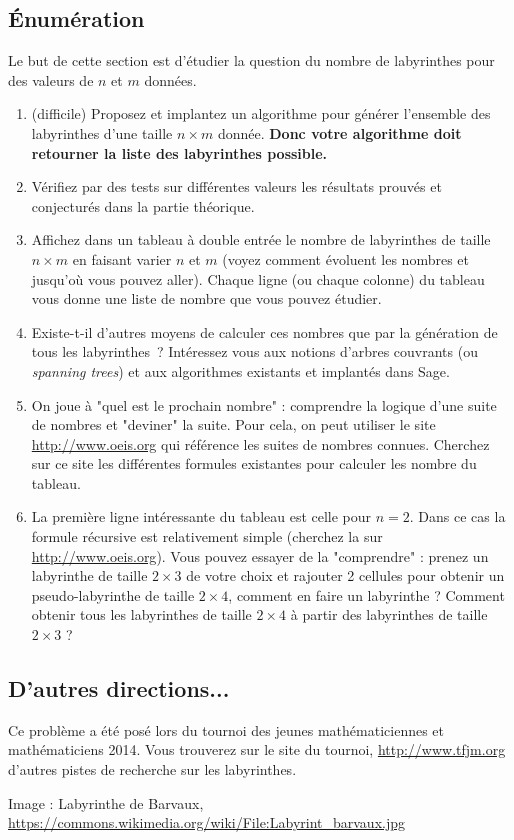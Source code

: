\documentclass{../ficheTDTP}
\begin{document}
\subsection{\'Enumération}

Le but de cette section est d'étudier la question du nombre de labyrinthes pour des valeurs de $n$ et $m$ données.

\begin{enumerate}
\item (difficile) Proposez et implantez un algorithme pour générer l'ensemble des labyrinthes d'une taille $n\times m$ donnée. \textbf{Donc votre algorithme doit retourner la liste des labyrinthes possible.}

\item Vérifiez par des tests sur différentes valeurs les résultats prouvés et conjecturés dans la partie théorique.

\item Affichez dans un tableau à double entrée le nombre de labyrinthes de taille $n \times m$ en faisant varier $n$ et $m$ (voyez comment évoluent les nombres et jusqu'où vous pouvez aller). Chaque ligne (ou chaque colonne) du tableau vous donne une liste de nombre que vous pouvez étudier. 

\item Existe-t-il d'autres moyens de calculer ces nombres que par la génération de tous les labyrinthes~? Intéressez vous aux notions d'arbres couvrants (ou \emph{spanning trees}) et aux algorithmes existants et implantés dans Sage. 

\item On joue à "quel est le prochain nombre" : comprendre la logique d'une suite de nombres et "deviner" la suite. Pour cela, on peut utiliser le site \url{http://www.oeis.org} qui référence les suites de nombres connues. Cherchez sur ce site les différentes formules existantes pour calculer les nombre du tableau. 

\item La première ligne intéressante du tableau est celle pour $n=2$. Dans ce cas la formule récursive est relativement simple (cherchez la sur \url{http://www.oeis.org}). Vous pouvez essayer de la "comprendre" : prenez un labyrinthe de taille $2 \times 3$ de votre choix et rajouter 2 cellules pour obtenir un pseudo-labyrinthe de taille $2 \times 4$, comment en faire un labyrinthe ? Comment obtenir tous les labyrinthes de taille $2 \times 4$ à partir des labyrinthes de taille $2 \times 3$ ?
\end{enumerate}


\subsection{D'autres directions...}

Ce problème a été posé lors du tournoi des jeunes mathématiciennes et mathématiciens 2014. Vous trouverez sur le site du tournoi, \url{http://www.tfjm.org} d'autres pistes de recherche sur les labyrinthes.

\vspace{2cm}
\footnotesize{Image : Labyrinthe de Barvaux, \url{https://commons.wikimedia.org/wiki/File:Labyrint_barvaux.jpg}}
\end{document}
